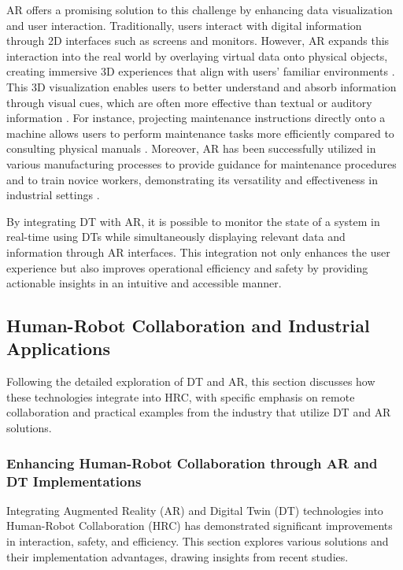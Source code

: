 \ac{AR} offers a promising solution to this challenge by enhancing data visualization and user interaction. Traditionally, users interact with digital 
information through 2D interfaces such as screens and monitors. However, \ac{AR} expands this interaction into the real world by overlaying virtual 
data onto physical objects, creating immersive 3D experiences that align with users' familiar environments \cite{peddie2017augmented}. This 3D visualization enables
users to better understand and absorb information through visual cues, which are often more effective than textual or auditory information \cite{article-teaching}.
For instance, projecting maintenance instructions directly onto a machine allows users to perform maintenance tasks more efficiently compared to 
consulting physical manuals \cite{inproceedings}. Moreover, \ac{AR} has been successfully utilized in various manufacturing processes to provide guidance 
for maintenance procedures and to train novice workers, demonstrating its versatility and effectiveness in industrial settings \cite{ong2004virtual}.

By integrating \ac{DT} with \ac{AR}, it is possible to monitor the state of a system in real-time using \ac{DT}s while simultaneously displaying relevant
data and information through \ac{AR} interfaces. This integration not only enhances the user experience but also improves operational efficiency and 
safety by providing actionable insights in an intuitive and accessible manner.

\subsection{Human-Robot Collaboration and Industrial Applications}
Following the detailed exploration of \ac{DT} and \ac{AR}, this section discusses how these technologies integrate into \ac{HRC}, with specific emphasis 
on remote collaboration and practical examples from the industry that utilize \ac{DT} and \ac{AR} solutions.

\subsubsection{Enhancing Human-Robot Collaboration through AR and DT Implementations}

Integrating Augmented Reality (AR) and Digital Twin (DT) technologies into Human-Robot Collaboration (HRC) has demonstrated significant improvements in 
interaction, safety, and efficiency. This section explores various solutions and their implementation advantages, drawing insights from recent studies.

